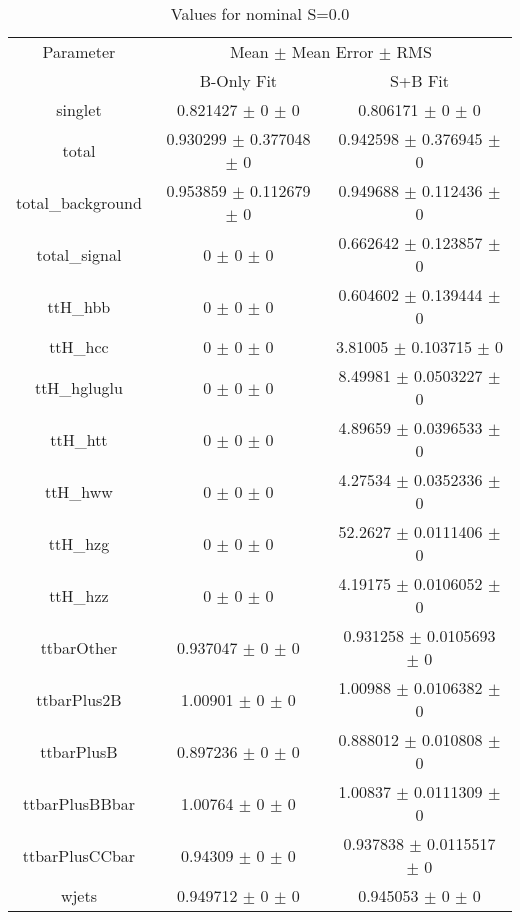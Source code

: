 \begin{table}
\centering
\caption{Values for nominal S=0.0}
\begin{tabular}{ccc}
\toprule
Parameter & \multicolumn{2}{c}{Mean $\pm$ Mean Error $\pm$ RMS}\\
 & B-Only Fit & S+B Fit\\
\midrule
singlet & \num{0.821427} $\pm$ \num{0} $\pm$ \num{0} & \num{0.806171} $\pm$ \num{0} $\pm$ \num{0}\\
total & \num{0.930299} $\pm$ \num{0.377048} $\pm$ \num{0} & \num{0.942598} $\pm$ \num{0.376945} $\pm$ \num{0}\\
total\_background & \num{0.953859} $\pm$ \num{0.112679} $\pm$ \num{0} & \num{0.949688} $\pm$ \num{0.112436} $\pm$ \num{0}\\
total\_signal & \num{0} $\pm$ \num{0} $\pm$ \num{0} & \num{0.662642} $\pm$ \num{0.123857} $\pm$ \num{0}\\
ttH\_hbb & \num{0} $\pm$ \num{0} $\pm$ \num{0} & \num{0.604602} $\pm$ \num{0.139444} $\pm$ \num{0}\\
ttH\_hcc & \num{0} $\pm$ \num{0} $\pm$ \num{0} & \num{3.81005} $\pm$ \num{0.103715} $\pm$ \num{0}\\
ttH\_hgluglu & \num{0} $\pm$ \num{0} $\pm$ \num{0} & \num{8.49981} $\pm$ \num{0.0503227} $\pm$ \num{0}\\
ttH\_htt & \num{0} $\pm$ \num{0} $\pm$ \num{0} & \num{4.89659} $\pm$ \num{0.0396533} $\pm$ \num{0}\\
ttH\_hww & \num{0} $\pm$ \num{0} $\pm$ \num{0} & \num{4.27534} $\pm$ \num{0.0352336} $\pm$ \num{0}\\
ttH\_hzg & \num{0} $\pm$ \num{0} $\pm$ \num{0} & \num{52.2627} $\pm$ \num{0.0111406} $\pm$ \num{0}\\
ttH\_hzz & \num{0} $\pm$ \num{0} $\pm$ \num{0} & \num{4.19175} $\pm$ \num{0.0106052} $\pm$ \num{0}\\
ttbarOther & \num{0.937047} $\pm$ \num{0} $\pm$ \num{0} & \num{0.931258} $\pm$ \num{0.0105693} $\pm$ \num{0}\\
ttbarPlus2B & \num{1.00901} $\pm$ \num{0} $\pm$ \num{0} & \num{1.00988} $\pm$ \num{0.0106382} $\pm$ \num{0}\\
ttbarPlusB & \num{0.897236} $\pm$ \num{0} $\pm$ \num{0} & \num{0.888012} $\pm$ \num{0.010808} $\pm$ \num{0}\\
ttbarPlusBBbar & \num{1.00764} $\pm$ \num{0} $\pm$ \num{0} & \num{1.00837} $\pm$ \num{0.0111309} $\pm$ \num{0}\\
ttbarPlusCCbar & \num{0.94309} $\pm$ \num{0} $\pm$ \num{0} & \num{0.937838} $\pm$ \num{0.0115517} $\pm$ \num{0}\\
wjets & \num{0.949712} $\pm$ \num{0} $\pm$ \num{0} & \num{0.945053} $\pm$ \num{0} $\pm$ \num{0}\\
\bottomrule
\end{tabular}
\end{table}